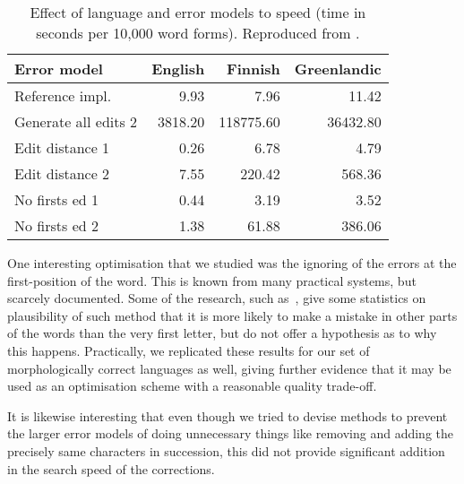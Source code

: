 \documentclass[officiallayout]{unihelcompling}
\begin{document}
\begin{table}
    \centering
\begin{tabular}{|l|rrr|}
\hline
\bf Error model & \bf English & \bf Finnish & \bf Greenlandic \\ 
\hline
Reference impl. &
9.93&7.96&11.42
\\
Generate all edits 2 & 
3818.20&118775.60&36432.80
\\
\hline
Edit distance 1 &
0.26&6.78&4.79
\\
Edit distance 2 &
7.55&220.42&568.36
\\
No firsts ed 1 & 
0.44&3.19&3.52
\\
No firsts ed 2 &
1.38&61.88&386.06
\\
\hline
\end{tabular}

    \caption{Effect of language and error models to speed (time in seconds per 
        10,000 word forms). Reproduced from .
    \label{table:fsmnlp-2012-repro}}
\end{table}

One interesting optimisation that we studied was the ignoring of the errors at
the first-position of the word. This is known from many practical systems, but
scarcely documented. Some of the research, such as~\citet{bhagat2007spelling},
give some statistics on plausibility of such method that it is more likely to
make a mistake in other parts of the words than the very first letter, but do
not offer a hypothesis as to why this happens.  Practically, we replicated
these results for our set of morphologically correct languages as well, giving
further evidence that it may be used as an optimisation scheme with a
reasonable quality trade-off.

It is likewise interesting that even though we tried to devise methods to
prevent the larger error models of doing unnecessary things like removing and
adding the precisely same characters in succession, this did not provide
significant addition in the search speed of the corrections.
\end{document}

